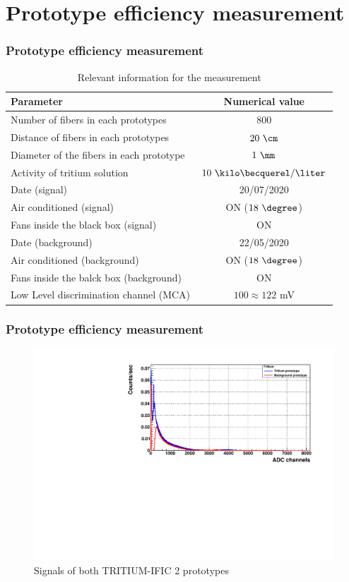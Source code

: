 \documentclass{beamer}
\begin{document}
\section{Prototype efficiency measurement}
\begin{frame}
\frametitle{Prototype efficiency measurement}

\begin{table}
\begin{tabular}{l | c}
Parameter & Numerical value\\
\hline \hline
Number of fibers in each prototypes & $800$ \\
Distance of fibers in each prototypes& $20~\cm$ \\
Diameter of the fibers in each prototype & $1~\mm$ \\
Activity of tritium solution & $10~\kilo\becquerel/\liter$ \\
Date (signal) & 20/07/2020 \\
Air conditioned (signal) & ON ($18~\degree$) \\
Fans inside the black box (signal) & ON \\
Date (background) & 22/05/2020 \\
Air conditioned (background) & ON ($18~\degree$) \\
Fans inside the balck box (background) & ON \\
Low Level discrimination channel (MCA) & $100\approx 122$ mV \\
\end{tabular}

\caption{Relevant information for the measurement}
\end{table}

\end{frame}


\begin{frame}
\frametitle{Prototype efficiency measurement}

\begin{figure}[hbtp]
\centering
\includegraphics[scale=0.6]{Imagenes/2Efficiency/Signal_background_real_time.pdf}
\caption{Signals of both TRITIUM-IFIC 2 prototypes}
\end{figure}


\end{frame}
\end{document}

